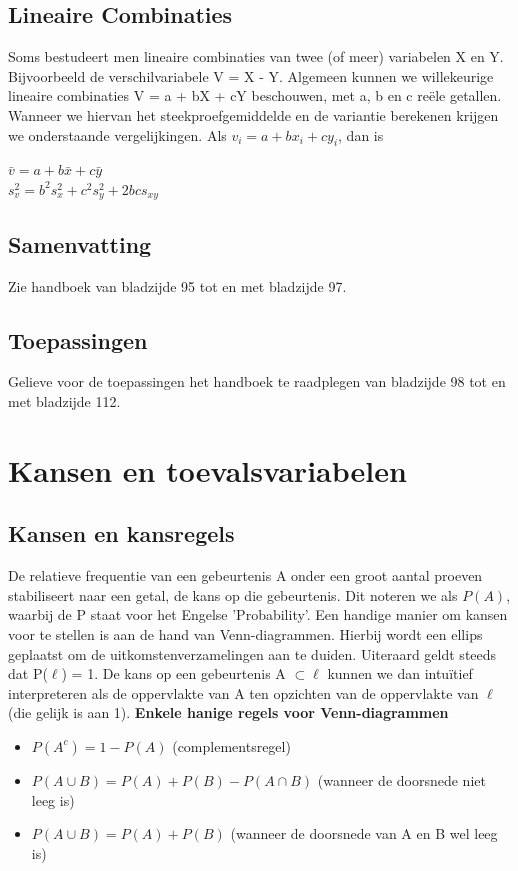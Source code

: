 \documentclass[titlepage]{article}
\numberwithin{equation}{section}
\begin{document}
 \subsection{Lineaire Combinaties}
 Soms bestudeert men lineaire combinaties van twee (of meer) variabelen X en Y. Bijvoorbeeld de verschilvariabele V = X - Y. \newline\newline
 Algemeen kunnen we willekeurige lineaire combinaties V = a + bX + cY beschouwen, met a, b en c reële getallen. Wanneer we hiervan het steekproefgemiddelde en de variantie berekenen krijgen we onderstaande vergelijkingen.\newline\newline
 Als $v_{i} = a+bx_{i}+cy_{i}$, dan is
 \begin{center}
 	$\bar{v}=a+b\bar{x}+c\bar{y}$ \\ $s_{v}^2=b^2s_{x}^2+c^2s_{y}^2+2bc s_{xy}$
 \end{center}
 \subsection{Samenvatting}
 Zie handboek van bladzijde 95 tot en met bladzijde 97.
 \subsection{Toepassingen}
 Gelieve voor de toepassingen het handboek te raadplegen van bladzijde 98 tot en met bladzijde 112.
 \section{Kansen en toevalsvariabelen}
 \subsection{Kansen en kansregels}
 De relatieve frequentie van een gebeurtenis A onder een groot aantal proeven stabiliseert naar een getal, de kans op die gebeurtenis. Dit noteren we als $P(A)$, waarbij de P staat voor het Engelse 'Probability'. \newline\newline
 Een handige manier om kansen voor te stellen is aan de hand van Venn-diagrammen. Hierbij wordt een ellips geplaatst om de uitkomstenverzamelingen aan te duiden. Uiteraard geldt steeds dat P($\ell$) = 1. De kans op een gebeurtenis A $\subset \ell$ kunnen we dan intuïtief interpreteren als de oppervlakte van A ten opzichten van de oppervlakte van $\ell$ (die gelijk is aan 1).\newline\newline
 \textbf{Enkele hanige regels voor Venn-diagrammen}\newline
 \begin{itemize}
 	\item $P(A^c) = 1-P(A)$ (complementsregel)
 	\item $P(A\cup B)=P(A)+P(B)-P(A\cap B)$ (wanneer de doorsnede niet leeg is)
 	\item $P(A\cup B)=P(A) + P(B)$ (wanneer de doorsnede van A en B wel leeg is)
 \end{itemize}
 
\end{document}

